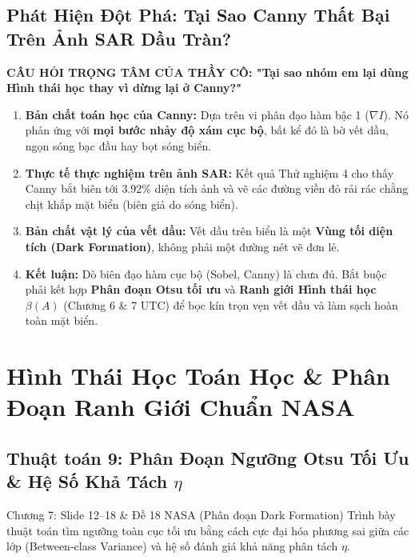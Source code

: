 \documentclass[11pt,a4paper]{article}
\begin{document}
\subsection{Phát Hiện Đột Phá: Tại Sao Canny Thất Bại Trên Ảnh SAR Dầu Tràn?}
\begin{whyuse}
\textbf{CÂU HỎI TRỌNG TÂM CỦA THẦY CÔ: "Tại sao nhóm em lại dùng Hình thái học thay vì dừng lại ở Canny?"}
\begin{enumerate}
    \item \textbf{Bản chất toán học của Canny:} Dựa trên vi phân đạo hàm bậc 1 ($\nabla I$). Nó phản ứng với \textbf{mọi bước nhảy độ xám cục bộ}, bất kể đó là bờ vết dầu, ngọn sóng bạc đầu hay bọt sóng biển.
    \item \textbf{Thực tế thực nghiệm trên ảnh SAR:} Kết quả Thử nghiệm 4 cho thấy Canny bắt biên tới $3.92\%$ diện tích ảnh và vẽ các đường viền đỏ rải rác chằng chịt khắp mặt biển (biên giả do sóng biển).
    \item \textbf{Bản chất vật lý của vết dầu:} Vết dầu trên biển là một \textbf{Vùng tối diện tích (Dark Formation)}, không phải một đường nét vẽ đơn lẻ.
    \item \textbf{Kết luận:} Dò biên đạo hàm cục bộ (Sobel, Canny) là chưa đủ. Bắt buộc phải kết hợp \textbf{Phân đoạn Otsu tối ưu} và \textbf{Ranh giới Hình thái học $\beta(A)$} (Chương 6 \& 7 UTC) để bọc kín trọn vẹn vết dầu và làm sạch hoàn toàn mặt biển.
\end{enumerate}
\end{whyuse}

\newpage

\section{Hình Thái Học Toán Học \& Phân Đoạn Ranh Giới Chuẩn NASA}

\subsection{Thuật toán 9: Phân Đoạn Ngưỡng Otsu Tối Ưu \& Hệ Số Khả Tách $\eta$}
\begin{slidemapping}{Chương 7: Slide 12--18 \& Đề 18 NASA (Phân đoạn Dark Formation)}
Trình bày thuật toán tìm ngưỡng toàn cục tối ưu bằng cách cực đại hóa phương sai giữa các lớp (Between-class Variance) và hệ số đánh giá khả năng phân tách $\eta$.
\end{slidemapping}
\end{document}
